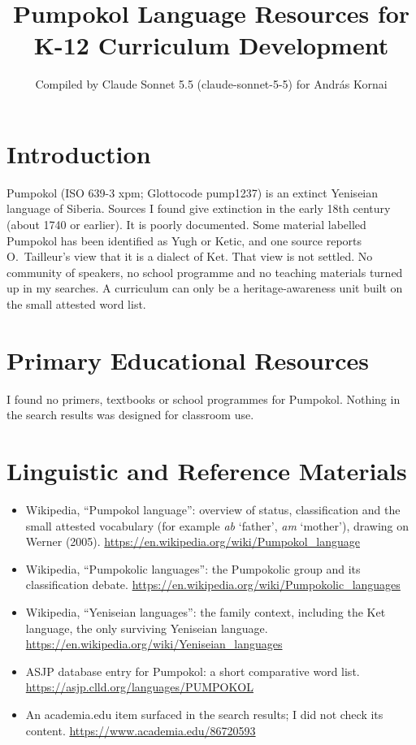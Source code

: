 \documentclass[12pt]{article}
\title{Pumpokol Language Resources for K-12 Curriculum Development}
\author{Compiled by Claude Sonnet 5.5 (claude-sonnet-5-5) for Andr\'as Kornai}
\date{}
\begin{document}
\maketitle

\section{Introduction}
Pumpokol (ISO 639-3 xpm; Glottocode pump1237) is an extinct Yeniseian language of Siberia. Sources I found give extinction in the early 18th century (about 1740 or earlier). It is poorly documented. Some material labelled Pumpokol has been identified as Yugh or Ketic, and one source reports O.\ Tailleur's view that it is a dialect of Ket. That view is not settled. No community of speakers, no school programme and no teaching materials turned up in my searches. A curriculum can only be a heritage-awareness unit built on the small attested word list.

\section{Primary Educational Resources}
I found no primers, textbooks or school programmes for Pumpokol. Nothing in the search results was designed for classroom use.

\section{Linguistic and Reference Materials}
\begin{itemize}
\item Wikipedia, ``Pumpokol language'': overview of status, classification and the small attested vocabulary (for example \emph{ab} `father', \emph{am} `mother'), drawing on Werner (2005). \url{https://en.wikipedia.org/wiki/Pumpokol_language}
\item Wikipedia, ``Pumpokolic languages'': the Pumpokolic group and its classification debate. \url{https://en.wikipedia.org/wiki/Pumpokolic_languages}
\item Wikipedia, ``Yeniseian languages'': the family context, including the Ket language, the only surviving Yeniseian language. \url{https://en.wikipedia.org/wiki/Yeniseian_languages}
\item ASJP database entry for Pumpokol: a short comparative word list. \url{https://asjp.clld.org/languages/PUMPOKOL}
\item An academia.edu item surfaced in the search results; I did not check its content. \url{https://www.academia.edu/86720593}
\end{itemize}
\end{document}
